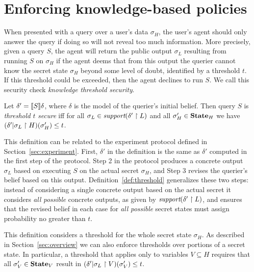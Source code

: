 \section{Enforcing knowledge-based policies}
\label{sec:policy}

When presented with a query over a user's data $\sigma_H$, the user's
agent should only answer the query if doing so will not reveal too
much information.  More precisely, given a query $S$, the agent will
return the public output $\sigma_L$ resulting from running $S$ on
$\sigma_H$ if the agent deems that from this output the querier cannot
know the secret state $\sigma_H$ beyond some level of doubt,
identified by a threshold $ t $.  If this threshold could be exceeded,
then the agent declines to run $S$.  We call this security check
\emph{knowledge threshold security}.

\begin{definition}
\label{def:threshold}
Let $\delta' = [\![{S}]\!]{\delta}$, where $\delta$ is the model of the
querier's initial belief.  Then query $S$ is \emph{threshold $ t $
  secure} iff for all $\sigma_L \in \textit{support}(\delta' \upharpoonright L)$ and
all $ \sigma'_H \in \textbf{State}_H$ we have
$(\delta' | \sigma_L \upharpoonright H)(\sigma'_H) \leq t$.
\end{definition}

This definition can be related to the experiment protocol defined in
Section~\ref{sec:experiment}.  First, $\delta'$ in the definition is
the same as $\delta'$ computed in the first step of the protocol.
Step 2 in the protocol produces a concrete output $\hat{\sigma}_L$
based on executing $S$ on the actual secret $\sigma_H$, and Step 3
revises the querier's belief based on this output.
Definition~\ref{def:threshold} generalizes these two steps: instead of
considering a single concrete output based on the actual secret it
considers \emph{all possible} concrete outputs, as given by
$\textit{support}(\delta' \upharpoonright L)$, and ensures that the revised belief in
each case for \emph{all possible} secret states must assign
probability no greater than $t$.

This definition considers a threshold for the whole secret state
$\sigma_H$.  As described in Section~\ref{sec:overview} we can also
enforce thresholds over portions of a secret state.  In particular, a
threshold that applies only to variables $V \subseteq H$ requires that
all $ \sigma'_V \in \textbf{State}_V$ result in
$(\delta' | \sigma_L \upharpoonright V)(\sigma'_V) \leq
t$.

